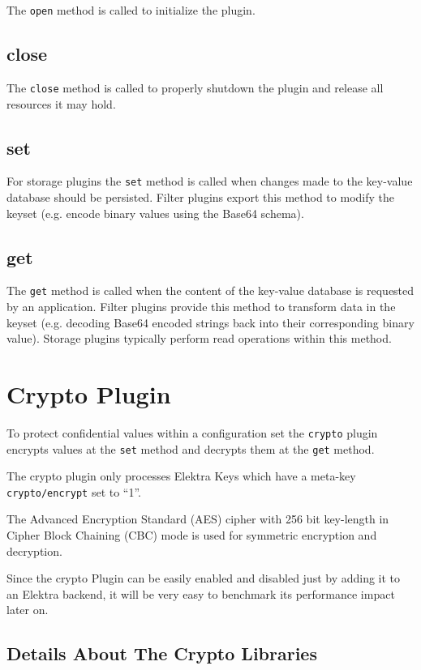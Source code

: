 The \texttt{open} method is called to initialize the plugin.

\subsection{close}\label{close}

The \texttt{close} method is called to properly shutdown the plugin and
release all resources it may hold.

\subsection{set}\label{set}

For storage plugins the \texttt{set} method is called when changes made to the key-value
database should be persisted.
Filter plugins export this method to modify the keyset (e.g. encode binary values using the Base64 schema).

\subsection{get}\label{get}

The \texttt{get} method is called when the content of the key-value
database is requested by an application.
Filter plugins provide this method to transform data in the keyset (e.g. decoding Base64 encoded strings back into their corresponding binary value).
Storage plugins typically perform read operations within this method.

\section{Crypto Plugin}\label{crypto-plugin}

To protect confidential values within a configuration set the
\texttt{crypto} plugin encrypts values at the \texttt{set} method and
decrypts them at the \texttt{get} method.

The crypto plugin only processes Elektra Keys which have a meta-key
\texttt{crypto/encrypt} set to ``1''.

The Advanced Encryption Standard (AES) cipher with 256 bit key-length in
Cipher Block Chaining (CBC) mode is used for symmetric encryption and
decryption.

Since the crypto Plugin can be easily enabled and disabled just by adding it to an Elektra backend,
it will be very easy to benchmark its performance impact later on.

\subsection{Details About The Crypto
Libraries}\label{details-about-the-crypto-libraries}

